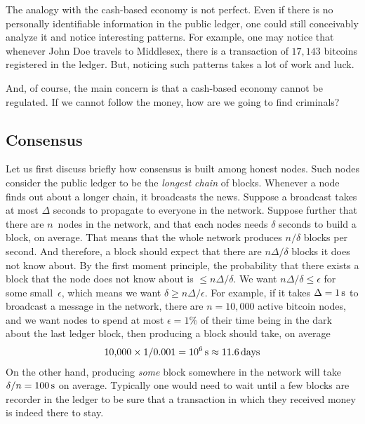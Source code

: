 The analogy with the cash-based economy is not perfect.
Even if there is no personally identifiable information in the public ledger, one could still conceivably analyze it and notice interesting patterns.
For example, one may notice that whenever John Doe travels to Middlesex, there is a transaction of $17{,}143$ bitcoins registered in the ledger.
But, noticing such patterns takes a lot of work and luck.

And, of course, the main concern is that a cash-based economy cannot be regulated.
If we cannot follow the money, how are we going to find criminals?


\subsection{Consensus}

Let us first discuss briefly how consensus is built among honest nodes.
Such nodes consider the public ledger to be the \emph{longest chain} of blocks.
Whenever a node finds out about a longer chain, it broadcasts the news.
Suppose a broadcast takes at most $\Delta$ seconds to propagate to everyone in the network.
Suppose further that there are $n$~nodes in the network, and that each nodes needs $\delta$ seconds to build a block, on average.
That means that the whole network produces $n/\delta$ blocks per second.
And therefore, a block should expect that there are $n\Delta/\delta$ blocks it does not know about.
By the first moment principle, the probability that there exists a block that the node does not know about is $\le n\Delta/\delta$.
We want $n\Delta/\delta\le\epsilon$ for some small~$\epsilon$, which means we want $\delta\ge n\Delta/\epsilon$.
For example, if it takes $\Delta=1\,\rm s$ to broadcast a message in the network, there are $n=10{,}000$ active bitcoin nodes, and we want nodes to spend at most $\epsilon=1\%$ of their time being in the dark about the last ledger block, then producing a block should take, on average
\begin{align*}
  10{,}000 \times 1 / 0.001 = 10^6\,{\rm s} \approx 11.6\,{\rm days}
\end{align*}
On the other hand, producing \emph{some} block somewhere in the network will take $\delta/n=100\,{\rm s}$ on average.
Typically one would need to wait until a few blocks are recorder in the ledger to be sure that a transaction in which they received money is indeed there to stay.

